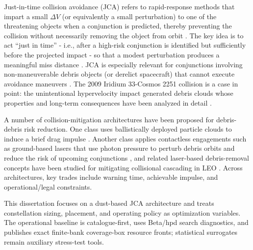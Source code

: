     Just-in-time collision avoidance (JCA) refers to rapid-response methods that impart a small $\Delta V$ (or equivalently a small perturbation) to one of the threatening objects when a conjunction is predicted, thereby preventing the collision without necessarily removing the object from orbit \citep{JARRY2019185}. The key idea is to act ``just in time'' - i.e., after a high-risk conjunction is identified but sufficiently before the projected impact - so that a modest perturbation produces a meaningful miss distance \citep{JARRY2019185,GonzaloColombo2020}. JCA is especially relevant for conjunctions involving non-maneuverable debris objects (or derelict spacecraft) that cannot execute avoidance maneuvers \citep{JARRY2019185}. The 2009 Iridium 33-Cosmos 2251 collision is a case in point: the unintentional hypervelocity impact generated debris clouds whose properties and long-term consequences have been analyzed in detail \citep{AnzMeadorLiou2010,MasonStuplMarshallLevit2011,ESA}.
    
    A number of collision-mitigation architectures have been proposed for debris-debris risk reduction. One class uses ballistically deployed particle clouds to induce a brief drag impulse \citep{JARRY2019185}. Another class applies contactless engagements such as ground-based lasers that use photon pressure to perturb debris orbits and reduce the risk of upcoming conjunctions \citep{MasonStuplMarshallLevit2011}, and related laser-based debris-removal concepts have been studied for mitigating collisional cascading in LEO \citep{Phipps2011lodr}. Across architectures, key trades include warning time, achievable impulse, and operational/legal constraints.
    
    This dissertation focuses on a dust-based JCA architecture and treats constellation sizing, placement, and operating policy as optimization variables. The operational baseline is catalogue-first, uses Beta/\gls{hpd} search diagnostics, and publishes exact finite-bank coverage-box resource fronts; statistical surrogates remain auxiliary stress-test tools.


